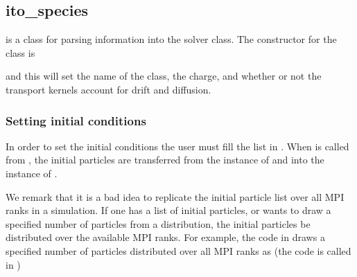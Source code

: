 \documentclass[letterpaper,10pt,english]{sphinxmanual}
\begin{document}
\subsection{ito\_species}
\label{\detokenize{Ito:ito-species}}\label{\detokenize{Ito:chap-ito-species}}
 is a class for parsing information into the solver class.
The constructor for the  class is

\begin{sphinxVerbatim}[commandchars=\\\{\},formatcom=\scriptsize]
           
\end{sphinxVerbatim}

and this will set the name of the class, the charge, and whether or not the transport kernels account for drift and diffusion.


\subsubsection{Setting initial conditions}
\label{\detokenize{Ito:setting-initial-conditions}}
In order to set the initial conditions the user must fill the list  in .
When  is called from , the initial particles are transferred from the instance of  and into the instance of .

We remark that it is a bad idea to replicate the initial particle list over all MPI ranks in a simulation.
If one has a list of initial particles, or wants to draw a specified number of particles from a distribution, the initial particles  be distributed over the available MPI ranks.
For example, the code in  draws a specified number of particles distributed over all MPI ranks as (the code is called in )
\end{document}
